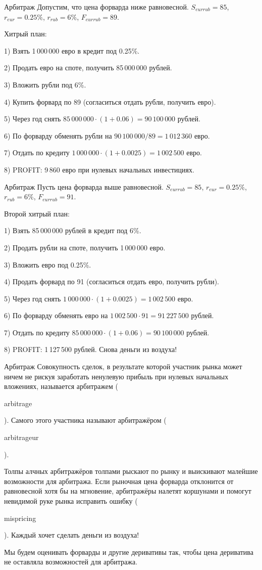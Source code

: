 \documentclass{beamer}
\newcommand{\en}[1]{\begin{otherlanguage}{english}#1\end{otherlanguage}}
\begin{document}
\begin{frame}{Арбитраж}
\justify
Допустим, что цена форварда ниже равновесной. $S_{eurrub}=85$, $r_{eur}=0.25\%$, $r_{rub}=6\%$, $F_{eurrub}=89$. 

\justify
Хитрый план:

1) Взять 1\,000\,000 евро в кредит под 0.25\%.

2) Продать евро на споте, получить 85\,000\,000 рублей.

3) Вложить рубли под 6\%.

4) Купить форвард по 89 (согласиться отдать рубли, получить евро).

5) Через год снять $85\,000\,000 \cdot (1+0.06) = 90\,100\,000$ рублей.

6) По форварду обменять рубли на $90\,100\,000 / 89 = 1\,012\,360$ евро.

7) Отдать по кредиту $1\,000\,000 \cdot (1 + 0.0025) = 1\,002\,500$ евро.

8) PROFIT: 9\,860 евро при нулевых начальных инвестициях.
\end{frame}



\begin{frame}{Арбитраж}
\justify
Пусть цена форварда выше равновесной. $S_{eurrub}=85$, $r_{eur}=0.25\%$, $r_{rub}=6\%$, $F_{eurrub}=91$. 

\justify
Второй хитрый план:

1) Взять 85\,000\,000 рублей в кредит под 6\%.

2) Продать рубли на споте, получить 1\,000\,000 евро.

3) Вложить евро под 0.25\%.

4) Продать форвард по 91 (согласиться отдать евро, получить рубли).

5) Через год снять $1\,000\,000 \cdot (1+0.0025) = 1\,002\,500$ евро.

6) По форварду обменять евро на $1\,002\,500 \cdot 91 = 91\,227\,500$ рублей.

7) Отдать по кредиту $85\,000\,000 \cdot (1 + 0.06) = 90\,100\,000$ рублей.

8) PROFIT: 1\,127\,500 рублей. Снова деньги из воздуха!
\end{frame}



\begin{frame}{Арбитраж}
\justify
Совокупность сделок, в результате которой участник рынка может ничем не рискуя заработать ненулевую прибыль при нулевых начальных вложениях, называется \alert{арбитражем} (\en{arbitrage}). Самого этого участника называют арбитражёром (\en{arbitrageur}).

\justify
Толпы алчных арбитражёров толпами рыскают по рынку и выискивают малейшие возможности для арбитража. Если рыночная цена форварда отклонится от равновесной хотя бы на мгновение, арбитражёры налетят коршунами и помогут невидимой руке рынка исправить ошибку (\en{mispricing}). Каждый хочет сделать деньги из воздуха! 

\justify
Мы будем оценивать форварды и другие деривативы так, чтобы цена дериватива не оставляла возможностей для арбитража.
\end{frame}
\end{document}
